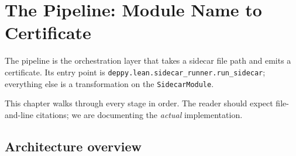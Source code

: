 \chapter{The Pipeline: Module Name to Certificate}
\label{ch:pipeline}

The \Deppy{} pipeline is the orchestration layer that takes a
sidecar file path and emits a \Lean{} certificate.  Its entry point
is \texttt{deppy.lean.sidecar\_runner.run\_sidecar}; everything
else is a transformation on the \texttt{SidecarModule}.

This chapter walks through every stage in order.  The reader should
expect file-and-line citations; we are documenting the
\emph{actual} implementation.

\section{Architecture overview}

